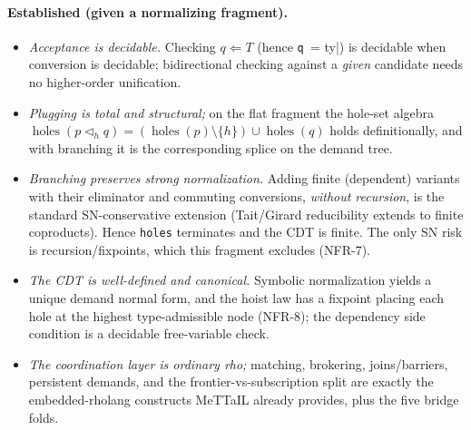 \documentclass[11pt]{article}
\newcommand{\plug}{\mathbin{\triangleleft}}
\newcommand{\Holes}{\ensuremath{\operatorname{holes}}}
\newcommand{\code}[1]{\lstinline[language=rho,basicstyle=\ttfamily\small]|#1|}
\begin{document}
\paragraph{Established (given a normalizing fragment).}
\begin{itemize}[leftmargin=1.4em,itemsep=2pt]
  \item \emph{Acceptance is decidable.} Checking $q \Leftarrow T$ (hence \code{q |= ty}) is decidable
  when conversion is decidable; bidirectional checking against a \emph{given} candidate needs no
  higher-order unification.
  \item \emph{Plugging is total and structural;} on the flat fragment the hole-set algebra
  $\Holes(p\plug_h q)=(\Holes(p)\setminus\{h\})\cup\Holes(q)$ holds definitionally, and with branching
  it is the corresponding splice on the demand tree.
  \item \emph{Branching preserves strong normalization.} Adding finite (dependent) variants with their
  eliminator and commuting conversions, \emph{without recursion}, is the standard SN-conservative
  extension (Tait/Girard reducibility extends to finite coproducts). Hence \code{holes} terminates and
  the CDT is finite. The only SN risk is recursion/fixpoints, which this fragment excludes (NFR-7).
  \item \emph{The CDT is well-defined and canonical.} Symbolic normalization yields a unique demand
  normal form, and the hoist law has a fixpoint placing each hole at the highest type-admissible node
  (NFR-8); the dependency side condition is a decidable free-variable check.
  \item \emph{The coordination layer is ordinary rho;} matching, brokering, joins/barriers, persistent
  demands, and the frontier-vs-subscription split are exactly the embedded-rholang constructs MeTTaIL
  already provides, plus the five bridge folds.
\end{itemize}
\end{document}
